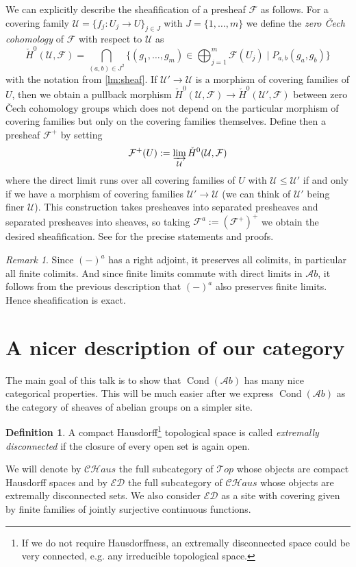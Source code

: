 \documentclass[11pt,A4]{article}
\theoremstyle{plain}
\theoremstyle{definition}
\newtheorem{defn}[thm]{Definition}
\theoremstyle{remark}
\newtheorem{rem}[thm]{Remark}
\newcommand{\1}{\mathbbm{1}}
\newcommand{\F}{\mathcal{F}}
\newcommand{\Top}{\mathscr{T}op}
\newcommand{\CHaus}{\mathscr{CH}aus}
\newcommand{\ED}{\mathscr{ED}}
\newcommand{\Ab}{\mathscr{A}b}
\DeclareMathOperator{\Cond}{Cond}
\begin{document}
We can explicitly describe the sheafification of a presheaf $\F$ as follows.
For a covering family $\mathcal{U}=\{f_{j}\colon U_{j}\to U\}_{j\in J}$ with $J=\{1,\ldots,m\}$ we define the \textit{zero \v{C}ech cohomology} of $\F$ with respect to $\mathcal{U}$ as
\[ \check{H}^{0}(\mathcal{U},\F)=\bigcap_{(a,b)\in J^{2}} \{ (g_{1},\ldots,g_{m})\in \bigoplus_{j=1}^{m}\F(U_{j}) \mid P_{a,b}(g_{a},g_{b})\} \]
with the notation from \cref{lm:sheaf}.
If $\mathcal{U}'\to \mathcal{U}$ is a morphism of covering families of $U$, then we obtain a pullback morphism $\check{H}^{0}(\mathcal{U},\F)\to \check{H}^{0}(\mathcal{U}',\F)$ between zero \v{C}ech cohomology groups which does not depend on the particular morphism of covering families but only on the covering families themselves.
Define then a presheaf $\F^{+}$ by setting
\[ \F^{+}(U):=\varinjlim_{\mathcal{U}} \check{H}^{0}(\mathcal{U},\F) \]
where the direct limit runs over all covering families of $U$ with $\mathcal{U}\leqslant \mathcal{U'}$ if and only if we have a morphism of covering families $\mathcal{U'}\to \mathcal{U}$ (we can think of $\mathcal{U'}$ being finer $\mathcal{U}$).
This construction takes presheaves into separated presheaves and separated presheaves into sheaves, so taking $\F^{a}:=(\F^{+})^{+}$ we obtain the desired sheafification.
See \cite[\href{https://stacks.math.columbia.edu/tag/03NQ}{Tag 03NQ}]{sta19} for the precise statements and proofs.

\begin{rem}
    Since $(-)^{a}$ has a right adjoint, it preserves all colimits, in particular all finite colimits.
    And since finite limits commute with direct limits in $\Ab$, it follows from the previous description that $(-)^{a}$ also preserves finite limits.
    Hence sheafification is exact.
\end{rem}

\section{A nicer description of our category}

The main goal of this talk is to show that $\Cond(\Ab)$ has many nice categorical properties.
This will be much easier after we express $\Cond(\Ab)$ as the category of sheaves of abelian groups on a simpler site.

\begin{defn}
    A compact Hausdorff\footnote{If we do not require Hausdorffness, an extremally disconnected space could be very connected, e.g. any irreducible topological space.} topological space is called \textit{extremally disconnected} if the closure of every open set is again open.

    We will denote by $\CHaus$ the full subcategory of $\Top$ whose objects are compact Hausdorff spaces and by $\ED$ the full subcategory of $\CHaus$ whose objects are extremally disconnected sets.
    We also consider $\ED$ as a site with covering given by finite families of jointly surjective continuous functions.
\end{defn}
\end{document}

